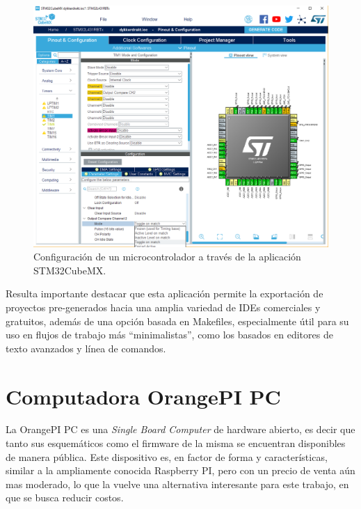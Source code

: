 \begin{figure}[ht]
    \centering
    \includegraphics[scale=.3]{./Figures/stm32_cubemx.png}
    \caption{Configuración de un microcontrolador a través de la aplicación STM32CubeMX.}
    \label{fig:stm32CubeMX}
\end{figure}

Resulta importante destacar que esta aplicación permite la exportación de proyectos pre-generados hacia una amplia variedad de IDEs comerciales y gratuitos, además de una opción basada en Makefiles, especialmente útil para su uso en flujos de trabajo más ``minimalistas'', como los basados en editores de texto avanzados y línea de comandos.





\section{Computadora OrangePI PC}

La OrangePI PC es una \textit{Single Board Computer} de hardware abierto, es decir que tanto sus esquemáticos como el firmware de la misma se encuentran disponibles de manera pública. Este dispositivo es, en factor de forma y características, similar a la ampliamente conocida Raspberry PI, pero con un precio de venta aún mas moderado, lo que la vuelve una alternativa interesante para este trabajo, en que se busca reducir costos.

